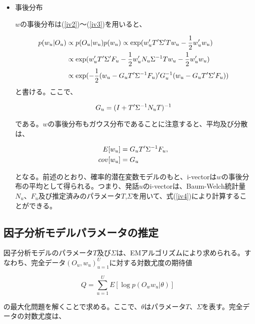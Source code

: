 \begin{itemize}
\item 事後分布\par
$w$の事後分布は(\ref{iv2})〜(\ref{iv3})を用いると、

\begin{align}
p(w_u|O_u) &\propto p(O_u|w_u)p(w_u)\propto \exp(w_u^\prime T^\prime \Sigma^\prime Tw_u-\frac{1}{2}w_u^\prime w_u) \notag \\ 
 &\propto \exp(w_u^\prime T^\prime \Sigma^\prime F_u-\frac{1}{2}w_u^\prime N_u\Sigma^{-1}Tw_u-\frac{1}{2}w_u^\prime w_u) \notag \\ 
 &\propto \exp(-\frac{1}{2}(w_u-G_uT^\prime\Sigma^{-1}F_u)^\prime G_u^{-1}(w_u-G_uT^\prime \Sigma^\prime F_u)) \notag
\end{align}
と書ける。ここで、

\begin{equation}
G_u=(I+T^\prime \Sigma^{-1}N_u T)^{-1} \notag
\end{equation}

である。$w$の事後分布もガウス分布であることに注意すると、平均及び分散は、

\begin{align}
\label{iv4}
E[w_u] &=G_uT^\prime \Sigma^{-1}F_u, \\
cov[w_u] &=G_u \notag
\end{align}

となる。前述のとおり、確率的潜在変数モデルのもと、i-vectorは$w$の事後分布の平均として得られる。つまり、発話$u$のi-vectorは、Baum-Welch統計量$N_u$、$F_u$及び推定済みのパラメータ$T$,$\Sigma$を用いて、式(\ref{iv4})により計算することができる。

\end{itemize}


\subsection{因子分析モデルパラメータの推定}
因子分析モデルのパラメータ$T$及び$\Sigma$は、EMアルゴリズムにより求められる。すなわち、完全データ${(O_u,w_u)}_{u=1}^{U}$に対する対数尤度の期待値

\begin{equation}
\label{iv5}
Q=\sum_{u=1}^{U}E[\log p(O_ww_u|\theta)]
\end{equation}

の最大化問題を解くことで求める。ここで、$\theta$はパラメータ$T$、$\Sigma$を表す。完全データの対数尤度は、

